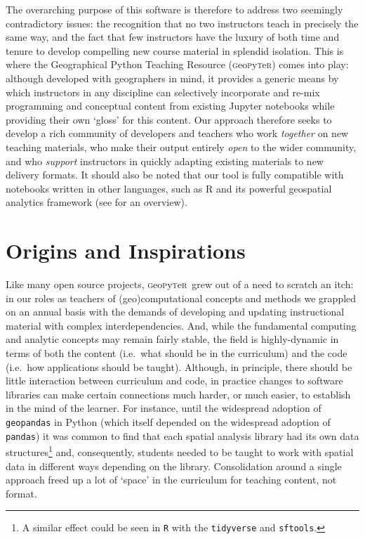 \documentclass[letter, 11pt,titlepage]{article}
\newcommand{\gp}{\textsc{g}eo\textsc{p}y\textsc{t}e\textsc{r}~\/}
\newcommand{\ie}{i.e.~\/}
\begin{document}
The overarching purpose of this software is therefore to address two seemingly contradictory issues: the recognition that no two instructors teach in precisely the same way, and the fact that few instructors have the luxury of both time and tenure to develop compelling new course material in splendid isolation. This is  where the Geographical Python Teaching Resource (\textsc{g}eo\textsc{p}y\textsc{t}e\textsc{r}) comes into play: although developed with geographers in mind, it provides a generic means by which instructors in any discipline can selectively incorporate and re-mix programming and conceptual content from existing Jupyter notebooks while providing their own `gloss' for this content. Our approach therefore seeks to develop a rich community of developers and teachers who work \emph{together} on new teaching materials, who make their output entirely \emph{open} to the wider community, and who \emph{support} instructors in quickly adapting existing materials to new delivery formats. It should also be noted that our tool is fully compatible with notebooks written in other languages, such as R and its powerful geospatial analytics framework (see \citealp{Bivand:2020aa} for an overview).

\section{Origins and Inspirations}\label{origins-and-inspirations}

Like many open source projects, \gp grew out of a need to scratch an itch: in our roles as teachers of (geo)computational concepts and methods we grappled on an annual basis with the demands of developing and updating instructional material with complex interdependencies. And, while the fundamental computing and analytic concepts may remain fairly stable, the field is highly-dynamic in terms of both the content (\ie what should be in the curriculum) and the code (\ie how applications should be taught). Although, in principle, there should be little interaction between curriculum and code, in practice changes to software libraries can make certain connections much harder, or much easier, to establish in the mind of the learner. For instance, until the widespread adoption of \texttt{geopandas} in Python (which itself depended on the widespread adoption of \texttt{pandas}) it was common to find that each spatial analysis library had its own data structures\footnote{A similar effect could be seen in \texttt{R} with the \texttt{tidyverse} and \texttt{sftools}.} and, consequently, students needed to be taught to work with spatial data in different ways depending on the library. Consolidation around a single approach freed up a lot of `space' in the curriculum for teaching content, not format.
\end{document}
